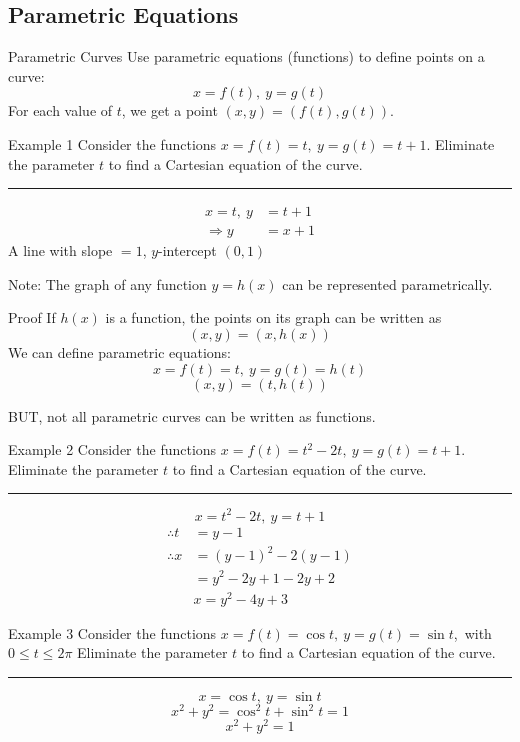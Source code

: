 \documentclass[12pt,a4paper]{article}
\begin{document}
\subsection{Parametric Equations}
\begin{df}{Parametric Curves}
	Use parametric equations (functions) to define points on a curve: \[x=f(t),\ y=g(t)\]
	For each value of $t$, we get a point $(x,y)=(f(t), g(t)).$	
\end{df}
\begin{eg}{Example 1}
	Consider the functions $x=f(t)=t,\ y=g(t)=t+1$. Eliminate the parameter $t$ to find a Cartesian equation of the curve. 	\\
	\noindent\rule[0.25\baselineskip]{\textwidth}{1pt}
	\[\begin{aligned}x=t,\ y&=t+1\\\Rightarrow y&=x+1\end{aligned}\]
	A line with slope $=1$, $y$-intercept $(0,1)$
\end{eg}
Note: The graph of any function $y=h(x)$ can be represented parametrically. 
\begin{prf}{Proof}
	If $h(x)$ is a function, the points on its graph can be written as \[(x, y)=(x, h(x))\]
	We can define parametric equations: 	\[x=f(t)=t,\ y=g(t)=h(t)\]\[(x, y)=(t, h(t))\]
\end{prf}
BUT, not all parametric curves can be written as functions. 
\begin{eg}{Example 2}
	Consider the functions $x=f(t)=t^2-2t,\ y=g(t)=t+1$. Eliminate the parameter $t$ to find a Cartesian equation of the curve. 	\\
	\noindent\rule[0.25\baselineskip]{\textwidth}{1pt}
	\[x=t^2-2t,\ y=t+1\]
	\[\begin{aligned}
		\therefore t&=y-1\\
		\therefore x&=(y-1)^2-2(y-1)\\
		&=y^2-2y+1-2y+2\\
		&\boxed{x=y^2-4y+3}
	\end{aligned}\]
\end{eg}
\begin{eg}{Example 3}
	Consider the functions $x=f(t)=\cos{t},\ y=g(t)=\sin{t}$,\ with $0\leq t\leq2\pi$ Eliminate the parameter $t$ to find a Cartesian equation of the curve. 	\\
	\noindent\rule[0.25\baselineskip]{\textwidth}{1pt}
	\[x=\cos{t},\ y=\sin{t}\]
	\[x^2+y^2=\cos^2t+\sin^2t=1\]
	\[\boxed{x^2+y^2=1}\]
\end{eg}
\end{document}
